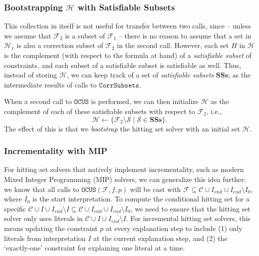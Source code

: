\documentclass[twoside,11pt]{article}
\newcommand\m[1]{\mathcal{#1}}
\newcommand\setstohit{\ensuremath{\m{H} }\xspace}
\newcommand\Iend{\ensuremath{I_\mathit{end} }\xspace}
\newcommand\formula{\ensuremath{\m{F} }\xspace}
\newcommand\formulac{\ensuremath{\m{C} }\xspace}
\newcommand\mm[1]{\ensuremath{#1}\xspace}
\newcommand\call[1]{\mm{\texttt{#1}}}
\newcommand\comus{\mm{\call{OCUS}}}
\newcommand\corrsubsets{\mm{\call{CorrSubsets}}}
\newcommand\satsets{\mm{\mathbf{SSs}}}
\begin{document}
\subsubsection{Bootstrapping $\setstohit$ with Satisfiable Subsets}\label{sec:bootstrapping-sat-subsets} This collection in itself is not useful for transfer between two calls, since -- unless we assume that $\formula_2$ is a subset of $\formula_1$ -- there is no reason to assume that a set in $\setstohit_1$ is also a correction subset of $\formula_2$ in the second call. 
However, each set $H$ in $\setstohit$ is the complement (with respect to the formula at hand) of a \emph{satisfiable subset} of constraints, and each subset of a satisfiable subset is satisfiable as well.
Thus, instead of storing $\setstohit$, we can keep track of a set of \emph{satisfiable subsets} \satsets ; as the intermediate results of calls to \corrsubsets.

When a second call to \comus is performed, we can then initialize $\setstohit$ as the complement of each of these satisfiable subsets with respect to $\formula_2$, i.e.,
 \begin{equation}
 \setstohit\gets \{\formula_2\setminus \m{S}\mid \m{S}\in \satsets\}.
 	\end{equation}
The effect of this is that we \textit{bootstrap} the hitting set solver with an initial set $\setstohit$. 

\subsubsection{Incrementality with MIP}\label{sec:mip-incrementality} 

For hitting set solvers that natively implement incrementality, such as modern Mixed Integer Programming (MIP) solvers, we can generalize this idea further: we know that all calls to $\comus(\formula,f,p)$ will be cast with $\formula \subseteq \m{C}\cup \Iend \cup \overline{\Iend \setminus I_0}$, where $I_0$ is the start interpretation. 
To compute the conditional hitting set for a specific $\formulac\cup I\cup \overline{\Iend\setminus I} \subseteq \m{C}\cup \Iend \cup \overline{\Iend \setminus I_0}$, we need to ensure that the hitting set solver only uses literals in $\formulac\cup I\cup \overline{\Iend\setminus I}$. 
For incremental hitting set solvers, this means updating the constraint $p$ at every explanation step to include (1) only literals from interpretation $I$ at the current explanation step, and (2) the `exactly-one' constraint for explaining one literal at a time.
\end{document}
